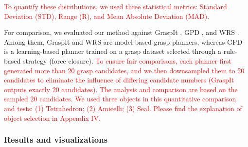 \documentclass[journal]{IEEEtran}
\newcommand{\rev}[1]{\textcolor{red}{#1}}
\begin{document}
\rev{To quantify these distributions, we used three statistical metrics: Standard Deviation (STD), Range (R), and Mean Absolute Deviation (MAD).} 


For comparison, we evaluated our method against GraspIt \cite{miller_graspit_2021}, GPD \cite{ten2017grasp}, and WRS \cite{wan2020planning}. Among them, GraspIt and WRS are model-based grasp planners, whereas GPD is a learning-based planner trained on a grasp dataset selected through a rule-based strategy (force closure). \rev{To ensure fair comparisons, each planner first generated more than 20 grasp candidates, and we then downsampled them to 20 candidates to eliminate the influence of differing candidate numbers (GraspIt outputs exactly 20 candidates). The analysis and comparison are based on the sampled 20 candidates.
We used three objects in this quantitative comparison and tests: (1) Tetrahedron; (2) Amicelli; (3) Seal. Please find the explanation of object selection in Appendix IV.}


\subsubsection{Results and visualizations}
\end{document}
